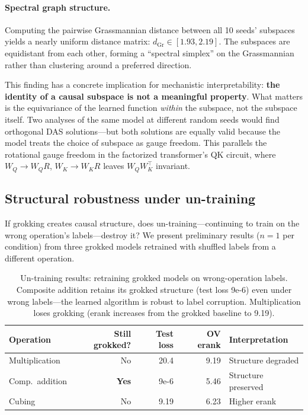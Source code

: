 \documentclass{article}
\newcommand{\Gr}{\mathrm{Gr}}
\begin{document}
\paragraph{Spectral graph structure.}
Computing the pairwise Grassmannian distance between all 10 seeds'
subspaces yields a nearly uniform distance matrix:
$d_{\Gr} \in [1.93, 2.19]$. The subspaces are equidistant from each other,
forming a ``spectral simplex'' on the Grassmannian rather than clustering
around a preferred direction.

This finding has a concrete implication for mechanistic interpretability:
\textbf{the identity of a causal subspace is not a meaningful property}.
What matters is the equivariance of the learned function \emph{within} the
subspace, not the subspace itself. Two analyses of the same model at
different random seeds would find orthogonal DAS solutions---but both
solutions are equally valid because the model treats the choice of
subspace as gauge freedom. This parallels the rotational gauge freedom
in the factorized transformer's QK circuit, where $W_Q \to W_Q R$,
$W_K \to W_K R$ leaves $W_Q W_K^\top$ invariant.

\subsection{Structural robustness under un-training}
\label{sec:un_training}

If grokking creates causal structure, does un-training---continuing to train
on the wrong operation's labels---destroy it? We present preliminary results
($n{=}1$ per condition) from three grokked models retrained with shuffled
labels from a different operation.

\begin{table}[t]
\centering
\small
\begin{tabular}{lrrrl}
\toprule
Operation & Still grokked? & Test loss & OV erank & Interpretation \\
\midrule
Multiplication & No & 20.4 & 9.19 & Structure degraded \\
Comp.\ addition & \textbf{Yes} & 9e-6 & 5.46 & Structure preserved \\
Cubing & No & 9.19 & 6.23 & Higher erank \\
\bottomrule
\end{tabular}
\caption{Un-training results: retraining grokked models on wrong-operation
labels. Composite addition retains its grokked structure (test loss 9e-6)
even under wrong labels---the learned algorithm is robust to label
corruption. Multiplication loses grokking (erank increases from the grokked
baseline to 9.19).}
\label{tab:un_training}
\end{table}
\end{document}
